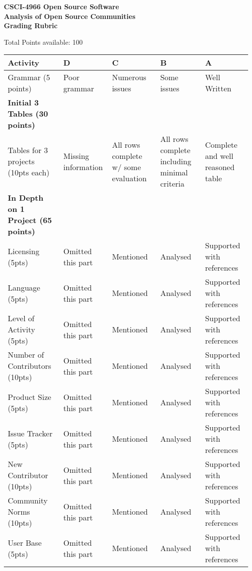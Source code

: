 \documentclass[11pt]{article}
\begin{document}
\begin{center}
\Large
\textbf{CSCI-4966 Open Source Software \\
Analysis of Open Source Communities \\
Grading Rubric}
\end{center}

Total Points available: 100 \\
\begin{tabularx}{\linewidth}{|l|X|X|X|X|}
	\hline
	Activity & D & C & B & A \\ \hline
	Grammar (5 points) & Poor grammar & Numerous issues & Some issues & Well Written \\ \hline
	\textbf{Initial 3 Tables (30 points)} & & & & \\ \hline
	Tables for 3 projects (10pts each) & Missing information & All rows complete w/ some evaluation & All rows complete including minimal criteria & Complete and well reasoned table \\ \hline
    \textbf{In Depth on 1 Project (65 points)}  & & & & \\ \hline
	Licensing (5pts) & Omitted this part & Mentioned & Analysed &Supported with references \\ \hline
	Language (5pts) & Omitted this part & Mentioned & Analysed &Supported with references \\ \hline
	Level of Activity (5pts) & Omitted this part & Mentioned & Analysed &Supported with references \\ \hline
	Number of Contributors (10pts) & Omitted this part & Mentioned & Analysed &Supported with references \\ \hline
	Product Size (5pts) & Omitted this part & Mentioned & Analysed &Supported with references \\ \hline
	Issue Tracker (5pts) & Omitted this part & Mentioned & Analysed &Supported with references \\ \hline
	New Contributor (10pts) & Omitted this part & Mentioned & Analysed &Supported with references \\ \hline
	Community Norms (10pts) & Omitted this part & Mentioned & Analysed &Supported with references \\ \hline
	User Base (5pts) & Omitted this part & Mentioned & Analysed &Supported with references \\ \hline
\end{tabularx}
\end{document}
